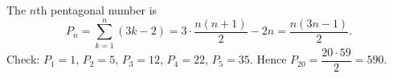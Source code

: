 The $n$th pentagonal number is
\[
P_n=\sum_{k=1}^{n}(3k-2)=3\cdot\dfrac{n(n+1)}{2}-2n=\dfrac{n(3n-1)}{2}.
\]
Check: $P_1=1$, $P_2=5$, $P_3=12$, $P_4=22$, $P_5=35$. Hence $P_{20}=\dfrac{20\cdot59}{2}=\boxed{590}$.
